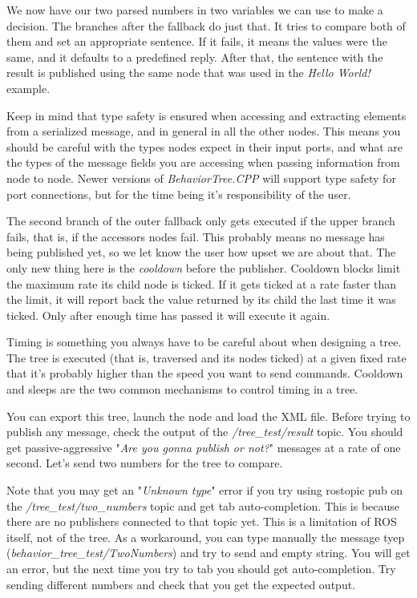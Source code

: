 \documentclass[a4paper,12pt]{article}
\begin{document}
We now have our two parsed numbers in two variables we can use to make a decision. The branches after the fallback do just that. It tries to compare both of them and set an appropriate sentence. If it fails, it means the values were the same, and it defaults to a predefined reply. After that, the sentence with the result is published using the same node that was used in the \textit{Hello World!} example.

Keep in mind that type safety is ensured when accessing and extracting elements from a serialized message, and in general in all the other nodes. This means you should be careful with the types nodes expect in their input ports, and what are the types of the message fields you are accessing when passing information from node to node. Newer versions of \textit{BehaviorTree.CPP} will support type safety for port connections, but for the time being it's responsibility of the user.

The second branch of the outer fallback only gets executed if the upper branch fails, that is, if the accessors nodes fail. This probably means no message has being published yet, so we let know the user how upset we are about that. The only new thing here is the \textit{cooldown} before the publisher. Cooldown blocks limit the maximum rate its child node is ticked. If it gets ticked at a rate faster than the limit, it will report back the value returned by its child the last time it was ticked. Only after enough time has passed it will execute it again.

Timing is something you always have to be careful about when designing a tree. The tree is executed (that is, traversed and its nodes ticked) at a given fixed rate that it's probably higher than the speed you want to send commands. Cooldown and sleeps are the two common mechanisms to control timing in a tree.

You can export this tree, launch the node and load the XML file. Before trying to publish any message, check the output of the \textit{/tree_test/result} topic. You should get passive-aggressive "\textit{Are you gonna publish or not?}" messages at a rate of one second. Let's send two numbers for the tree to compare.

Note that you may get an "\textit{Unknown type}" error if you try using rostopic pub on the \textit{/tree_test/two_numbers} topic and get tab auto-completion. This is because there are no publishers connected to that topic yet. This is a limitation of ROS itself, not of the tree. As a workaround, you can type manually the message tyep (\textit{behavior_tree_test/TwoNumbers}) and try to send and empty string. You will get an error, but the next time you try to tab you should get auto-completion. Try sending different numbers and check that you get the expected output.
\end{document}
